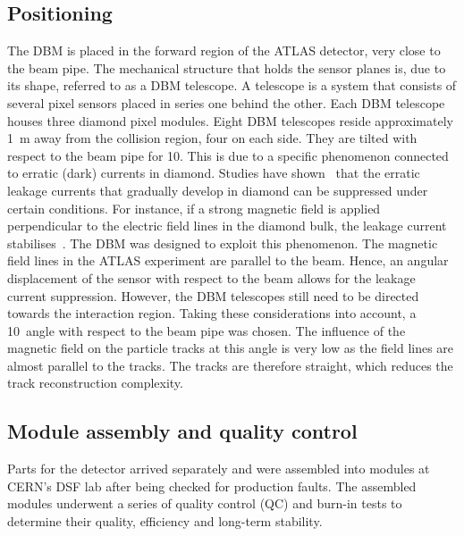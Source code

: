 \documentclass[12pt]{packages/mytustyle}  %
\begin{document}
\subsection{Positioning}
The DBM is placed in the forward region of the ATLAS detector, very close to the beam pipe. The mechanical structure that holds the sensor planes is, due to its shape, referred to as a DBM telescope. A telescope is a system that consists of several pixel sensors placed in series one behind the other. Each DBM telescope houses three diamond pixel modules. Eight DBM telescopes reside approximately 1~m away from the collision region, four on each side. They are tilted with respect to the beam pipe for 10\textdegree. This is due to a specific phenomenon connected to erratic (dark) currents in diamond. Studies have shown~\cite{} that the erratic leakage currents that gradually develop in diamond can be suppressed under certain conditions. For instance, if a strong magnetic field is applied perpendicular to the electric field lines in the diamond bulk, the leakage current stabilises~\cite{}. The DBM was designed to exploit this phenomenon. The magnetic field lines in the ATLAS experiment are parallel to the beam. Hence, an angular displacement of the sensor with respect to the beam allows for the leakage current suppression. However, the DBM telescopes still need to be directed towards the interaction region. Taking these considerations into account, a 10\textdegree~angle with respect to the beam pipe was chosen. The influence of the magnetic field on the particle tracks at this angle is very low as the field lines are almost parallel to the tracks. The tracks are therefore straight, which reduces the track reconstruction complexity.



\subsection{Module assembly and quality control}
Parts for the detector arrived separately and were assembled into modules at CERN's DSF lab after being checked for production faults. The assembled modules underwent a series of quality control (QC) and burn-in tests to determine their quality, efficiency and long-term stability.
\end{document}
